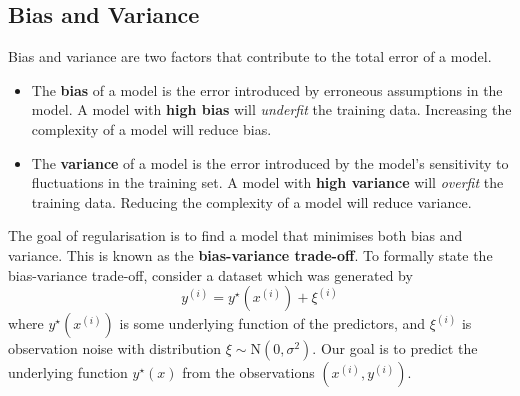 \documentclass{article}
\begin{document}
\subsection{Bias and Variance}
Bias and variance are two factors that contribute to the total error of
a model.
\begin{itemize}
    \item The \textbf{bias} of a model is the error introduced by
          erroneous assumptions in the model. A model with \textbf{high
          bias} will \textit{underfit} the training data. Increasing
          the complexity of a model will reduce bias.
    \item The \textbf{variance} of a model is the error introduced by
          the model's sensitivity to fluctuations in the training set.
          A model with \textbf{high variance} will \textit{overfit} the
          training data. Reducing the complexity of a model will reduce
          variance.
\end{itemize}
The goal of regularisation is to find a model that minimises both bias
and variance. This is known as the \textbf{bias-variance trade-off}.
To formally state the bias-variance trade-off, consider a dataset which
was generated by
\begin{equation*}
    y^{\left( i \right)} = y^\star\left( x^{\left( i \right)} \right) + \xi^{\left( i \right)}
\end{equation*}
where \(y^\star\left( x^{\left( i \right)} \right)\) is some underlying
function of the predictors, and \(\xi^{\left( i \right)}\) is observation
noise with distribution \(\xi \sim \mathrm{N}\left( 0, \sigma^2 \right)\).
Our goal is to predict the underlying function \(y^\star\left( x \right)\)
from the observations \(\left( x^{\left( i \right)}, y^{\left( i \right)} \right)\).
\end{document}
